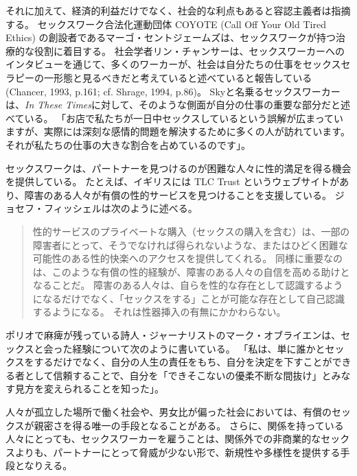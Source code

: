 \documentclass[paper=a4,book,openany]{jlreq} \usepackage{mystyle}
\begin{document}
それに加えて、経済的利益だけでなく、社会的な利点もあると容認主義者は指摘する。
セックスワーク合法化運動団体 COYOTE (Call Off Your Old Tired Ethics) の創設者であるマーゴ・セントジェームズは、セックスワークが持つ治療的な役割に着目する。
社会学者リン・チャンサーは、セックスワーカーへのインタビューを通じて、多くのワーカーが、社会は自分たちの仕事をセックスセラピーの一形態と見るべきだと考えていると述べていると報告している(Chancer, 1993, p.161; cf. Shrage, 1994, p.86)。
\nocite{chancer93:_prost_femin_theor_ambiv}\nocite{shrage93:_moral_dilem_femin}
Skyと名乗るセックスワーカーは、\emph{In These Times}に対して、そのような側面が自分の仕事の重要な部分だと述べている。
「お店で私たちが一日中セックスしているという誤解が広まっていますが、実際には深刻な感情的問題を解決するために多くの人が訪れています。
それが私たちの仕事の大きな割合を占めているのです」\citep{weisman18:_when_sex_worker_do_labor_therap}。

セックスワークは、パートナーを見つけるのが困難な人々に性的満足を得る機会を提供している。
たとえば、イギリスには TLC Trust というウェブサイトがあり、障害のある人々が有償の性的サービスを見つけることを支援している。
ジョセフ・フィッシェルは次のように述べる。

\begin{quote}

性的サービスのプライベートな購入（セックスの購入を含む）は、一部の障害者にとって、そうでなければ得られないような、またはひどく困難な可能性のある性的快楽へのアクセスを提供してくれる。
同様に重要なのは、このような有償の性的経験が、障害のある人々の自信を高める助けとなることだ。
障害のある人々は、自らを性的な存在として認識するようになるだけでなく、「セックスをする」ことが可能な存在として自己認識するようになる。
それは性器挿入の有無にかかわらない。
\citep[p.220]{fischel18:screwconsent}
\end{quote}

ポリオで麻痺が残っている詩人・ジャーナリストのマーク・オブライエンは、セックスと会った経験について次のように書いている。
「私は、単に誰かとセックスをするだけでなく、自分の人生の責任をもち、自分を決定を下すことができる者として信頼することで、自分を「できそこないの優柔不断な間抜け」とみなす見方を変えられることを知った」\citep{obrien90:_seein_sex_surrog}。

人々が孤立した場所で働く社会や、男女比が偏った社会においては、有償のセックスが親密さを得る唯一の手段となることがある。
さらに、関係を持っている人々にとっても、セックスワーカーを雇うことは、関係外での非商業的なセックスよりも、パートナーにとって脅威が少ない形で、新規性や多様性を提供する手段となりえる\citep{mesko12:_effec_prost_stabil_roman_relat}。
\end{document}
